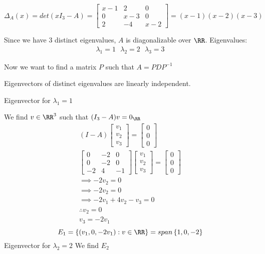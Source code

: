 \documentclass[11pt]{scrartcl}
\begin{document}
\begin{soln}
	\[
	\Delta_A(x) = det(xI_3 - A) = 
	\begin{bmatrix}
	x-1 & 2 & 0\\
	0 & x-3 & 0\\
	2 & -4 & x-2
	\end{bmatrix}
	= (x-1)(x-2)(x-3)
	\]
	
	Since we have 3 distinct eigenvalues, $A$ is diagonalizable over $\RR$.
	Eigenvalues:
	\begin{align*}
	\lambda_1 = 1 \text{   } \lambda_2 = 2 \text{   } \lambda_3 = 3
	\end{align*}
	
	Now we want to find a matrix $P$ such that $A = PDP^{-1}$
	
	Eigenvectors of distinct eigenvalues are linearly independent.
	
	Eigenvector for $\lambda_1 = 1$
	
	We find $v \in \RR^3$ such that $(I_3 - A)v = 0_{\RR}$
	\begin{align*}
		(I-A)
		\begin{bmatrix}
			v_1\\
			v_2\\
			v_3
		\end{bmatrix} = 
		\begin{bmatrix}
			0\\
			0\\
			0
		\end{bmatrix}
		\\
		\begin{bmatrix}
			0 & -2 & 0\\
			0 & -2 & 0\\
			-2 & 4 & -1
		\end{bmatrix}
		\begin{bmatrix}
			v_1\\
			v_2\\
			v_3
		\end{bmatrix} = 
		\begin{bmatrix}
			0\\
			0\\
			0
		\end{bmatrix}\\
		\implies -2v_2 = 0\\
		\implies -2v_2 = 0\\
		\implies -2v_1+4v_2-v_3 = 0\\
		\therefore v_2 = 0\\
		v_3 = -2v_1
	\end{align*}
	\[
	E_1 = \left\{(v_1, 0, -2v_1): v \in \RR\right\} = span\left\{1, 0, -2\right\}
	\]
	Eigenvector for $\lambda_2=2$ We find $E_2$
\end{soln}
\end{document}
